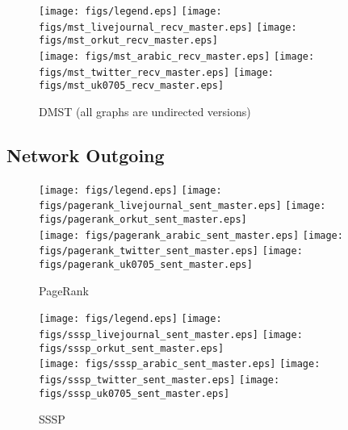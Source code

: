 \documentclass{article}
\newcommand{\bline}[1][1]{\vspace{#1\baselineskip}}
\begin{document}
\begin{figure}[!h]
  \bline[3.5]
  \centering
  \texttt{[image: figs/legend.eps]}\hspace{3em}%
  \texttt{[image: figs/mst\_livejournal\_recv\_master.eps]}\hspace{1em}%
  \texttt{[image: figs/mst\_orkut\_recv\_master.eps]}\\
  \texttt{[image: figs/mst\_arabic\_recv\_master.eps]}\hspace{1em}%
  \texttt{[image: figs/mst\_twitter\_recv\_master.eps]}\hspace{1em}%
  \texttt{[image: figs/mst\_uk0705\_recv\_master.eps]}
  \caption{DMST (all graphs are undirected versions)}
\end{figure}

\pagebreak
\subsection{Network Outgoing}
\begin{figure}[!h]
  \bline[1]
  \centering
  \texttt{[image: figs/legend.eps]}\hspace{3em}%
  \texttt{[image: figs/pagerank\_livejournal\_sent\_master.eps]}\hspace{1em}%
  \texttt{[image: figs/pagerank\_orkut\_sent\_master.eps]}\\
  \texttt{[image: figs/pagerank\_arabic\_sent\_master.eps]}\hspace{1em}%
  \texttt{[image: figs/pagerank\_twitter\_sent\_master.eps]}\hspace{1em}%
  \texttt{[image: figs/pagerank\_uk0705\_sent\_master.eps]}
  \caption{PageRank}
\end{figure}

\begin{figure}[!h]
  \bline[3.5]
  \centering
  \texttt{[image: figs/legend.eps]}\hspace{3em}%
  \texttt{[image: figs/sssp\_livejournal\_sent\_master.eps]}\hspace{1em}%
  \texttt{[image: figs/sssp\_orkut\_sent\_master.eps]}\\
  \texttt{[image: figs/sssp\_arabic\_sent\_master.eps]}\hspace{1em}%
  \texttt{[image: figs/sssp\_twitter\_sent\_master.eps]}\hspace{1em}%
  \texttt{[image: figs/sssp\_uk0705\_sent\_master.eps]}
  \caption{SSSP}
\end{figure}
\end{document}
